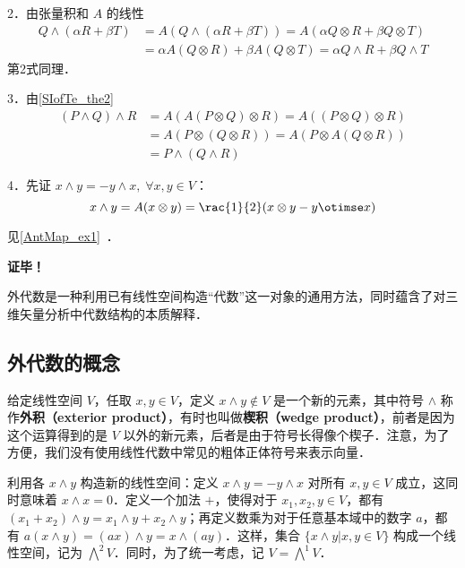 2．由张量积和 $A$ 的线性
\begin{equation}
\begin{aligned}
Q\wedge(\alpha R+\beta T)&=A(Q\wedge(\alpha R+\beta T))=A(\alpha Q\otimes R+\beta Q\otimes T)\\
&=\alpha A(Q\otimes R)+\beta A(Q\otimes T)=\alpha Q\wedge R+\beta Q\wedge T
\end{aligned}
\end{equation}
第2式同理．

3．由\autoref{SIofTe_the2}~
\begin{equation}
\begin{aligned}
(P\wedge Q)\wedge R&=A(A(P\otimes Q)\otimes R)=A((P\otimes Q)\otimes R)\\
&=A(P\otimes (Q\otimes R))=A(P\otimes A(Q\otimes R))\\
&=P\wedge (Q\wedge R)
\end{aligned}
\end{equation}

4．先证 $x\wedge y=-y\wedge x,\;\forall x,y\in V$：
\begin{equation}
x\wedge y=A(x\otimes y)=\rac{1}{2}(x\otimes y-y\otimse x)
\end{equation}


见\autoref{AntMap_ex1}~．

\textbf{证毕！}




外代数是一种利用已有线性空间构造“代数”这一对象的通用方法，同时蕴含了对三维矢量分析中代数结构的本质解释．

\subsection{外代数的概念}

给定线性空间 $V$，任取 $x, y\in V$，定义 $x\wedge y\not\in V$ 是一个新的元素，其中符号 $\wedge$ 称作\textbf{外积（exterior product）}，有时也叫做\textbf{楔积（wedge product）}，前者是因为这个运算得到的是 $V$ 以外的新元素，后者是由于符号长得像个楔子．注意，为了方便，我们没有使用线性代数中常见的粗体正体符号来表示向量．

利用各 $x\wedge y$ 构造新的线性空间：定义 $x\wedge y=-y\wedge x$ 对所有 $x, y\in V$ 成立，这同时意味着 $x\wedge x=0$．定义一个加法 $+$，使得对于 $x_1, x_2, y\in V$，都有 $(x_1+x_2)\wedge y=x_1\wedge y+x_2\wedge y$；再定义数乘为对于任意基本域中的数字 $a$，都有 $a(x\wedge y)=(ax)\wedge y=x\wedge(ay)$．这样，集合 $\{x\wedge y|x, y\in V\}$ 构成一个线性空间，记为 $\bigwedge^2 V$．同时，为了统一考虑，记 $V=\bigwedge^1 V$．

